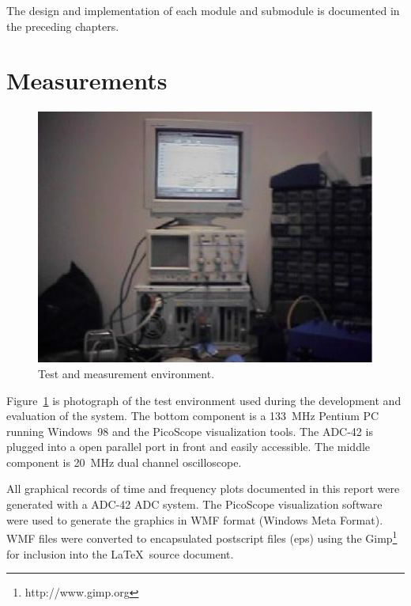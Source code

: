 The design and implementation of each module and submodule is
documented in the preceding chapters.

\section{Measurements}

\begin{figure}[htbp]
\begin{center}
	\includegraphics{test-setup.ps}
	\caption{Test and measurement environment.}
\label{fig:test+measure}
\end{center}
\end{figure}
 
Figure~\ref{fig:test+measure} is photograph of the test environment
used during the development and evaluation of the system. The bottom
component is a 133~MHz Pentium PC running Windows~98 and the PicoScope
visualization tools. The ADC-42 is plugged into a open parallel port
in front and easily accessible. The middle component is 20~MHz dual
channel oscilloscope. 

All graphical records of time and frequency plots documented in this
report were generated with a ADC-42 ADC system. The PicoScope
visualization software were used to generate the graphics in WMF
format (Windows Meta Format). WMF files were converted to encapsulated
postscript files (eps) using the Gimp\footnote{http://www.gimp.org}
for inclusion into the \LaTeX~source document.


